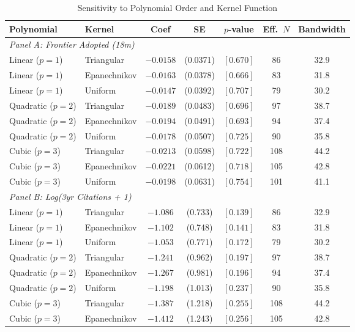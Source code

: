 \begin{table}[htbp]
\centering
\caption{Sensitivity to Polynomial Order and Kernel Function}
\label{tab:polykernel}
\begin{adjustbox}{max width=\textwidth}
\begin{tabular}{llccccc}
\hline\hline
Polynomial & Kernel & Coef & SE & $p$-value & Eff.\ $N$ & Bandwidth \\
\hline
\multicolumn{7}{l}{\textit{Panel A: Frontier Adopted (18m)}} \\
Linear ($p=1$) & Triangular & $-0.0158$ & (0.0371) & $[0.670]$ & 86 & 32.9 \\
Linear ($p=1$) & Epanechnikov & $-0.0163$ & (0.0378) & $[0.666]$ & 83 & 31.8 \\
Linear ($p=1$) & Uniform & $-0.0147$ & (0.0392) & $[0.707]$ & 79 & 30.2 \\
Quadratic ($p=2$) & Triangular & $-0.0189$ & (0.0483) & $[0.696]$ & 97 & 38.7 \\
Quadratic ($p=2$) & Epanechnikov & $-0.0194$ & (0.0491) & $[0.693]$ & 94 & 37.4 \\
Quadratic ($p=2$) & Uniform & $-0.0178$ & (0.0507) & $[0.725]$ & 90 & 35.8 \\
Cubic ($p=3$) & Triangular & $-0.0213$ & (0.0598) & $[0.722]$ & 108 & 44.2 \\
Cubic ($p=3$) & Epanechnikov & $-0.0221$ & (0.0612) & $[0.718]$ & 105 & 42.8 \\
Cubic ($p=3$) & Uniform & $-0.0198$ & (0.0631) & $[0.754]$ & 101 & 41.1 \\
\hline
\multicolumn{7}{l}{\textit{Panel B: Log(3yr Citations + 1)}} \\
Linear ($p=1$) & Triangular & $-1.086$ & (0.733) & $[0.139]$ & 86 & 32.9 \\
Linear ($p=1$) & Epanechnikov & $-1.102$ & (0.748) & $[0.141]$ & 83 & 31.8 \\
Linear ($p=1$) & Uniform & $-1.053$ & (0.771) & $[0.172]$ & 79 & 30.2 \\
Quadratic ($p=2$) & Triangular & $-1.241$ & (0.962) & $[0.197]$ & 97 & 38.7 \\
Quadratic ($p=2$) & Epanechnikov & $-1.267$ & (0.981) & $[0.196]$ & 94 & 37.4 \\
Quadratic ($p=2$) & Uniform & $-1.198$ & (1.013) & $[0.237]$ & 90 & 35.8 \\
Cubic ($p=3$) & Triangular & $-1.387$ & (1.218) & $[0.255]$ & 108 & 44.2 \\
Cubic ($p=3$) & Epanechnikov & $-1.412$ & (1.243) & $[0.256]$ & 105 & 42.8 \\

\end{tabular}
\end{adjustbox}
\end{table}

